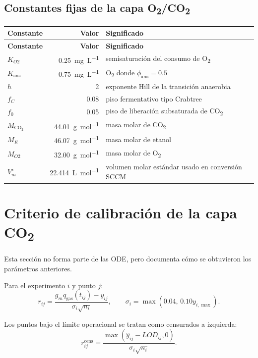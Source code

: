 \documentclass[11pt,a4paper]{article}
\newcommand{\COtwo}{\mathrm{CO_2}}
\begin{document}
\subsection{Constantes fijas de la capa O\textsubscript{2}/CO\textsubscript{2}}

\begin{longtable}{lrl}
\toprule
\textbf{Constante} & \textbf{Valor} & \textbf{Significado}\\
\midrule
\endfirsthead
\toprule
\textbf{Constante} & \textbf{Valor} & \textbf{Significado}\\
\midrule
\endhead
$K_{O2}$ & \SI{0.25}{mg.L^{-1}} & semisaturación del consumo de O\textsubscript{2}\\
$K_{\mathrm{ana}}$ & \SI{0.75}{mg.L^{-1}} & O\textsubscript{2} donde $\phi_{\mathrm{ana}}=0.5$\\
$h$ & 2 & exponente Hill de la transición anaerobia\\
$f_C$ & 0.08 & piso fermentativo tipo Crabtree\\
$f_0$ & 0.05 & piso de liberación subsaturada de CO\textsubscript{2}\\
$M_{\COtwo}$ & \SI{44.01}{g.mol^{-1}} & masa molar de CO\textsubscript{2}\\
$M_E$ & \SI{46.07}{g.mol^{-1}} & masa molar de etanol\\
$M_{O2}$ & \SI{32.00}{g.mol^{-1}} & masa molar de O\textsubscript{2}\\
$V_m^\circ$ & \SI{22.414}{L.mol^{-1}} & volumen molar estándar usado en conversión SCCM\\
\bottomrule
\end{longtable}

\section{Criterio de calibración de la capa CO\textsubscript{2}}

Esta sección no forma parte de las ODE, pero documenta cómo se obtuvieron los parámetros anteriores.

Para el experimento $i$ y punto $j$:
\begin{equation}
r_{ij}
=
\frac{
g_mq_{\mathrm{gas}}(t_{ij})-y_{ij}
}{
\sigma_i\sqrt{n_i}
},
\qquad
\sigma_i=
\max(0.04,\,0.10y_{i,\max}).
\label{eq:residual}
\end{equation}

Los puntos bajo el límite operacional se tratan como censurados a izquierda:
\begin{equation}
r_{ij}^{\mathrm{cens}}
=
\frac{
\max(\widehat y_{ij}-LOD_{ij},0)
}{
\sigma_i\sqrt{n_i}
}.
\label{eq:censored}
\end{equation}
\end{document}
